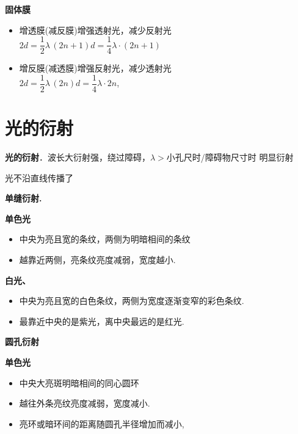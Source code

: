 \textbf{固体膜}

\begin{itemize}
\item 增透膜(减反膜)\quad 增强透射光，减少反射光\\
  $2d=\dfrac{1}{2}\lambda\,(2n+1)$\qquad $d=\dfrac{1}{4}\lambda\cdot(2n+1)$
\item 增反膜(减透膜)\quad 增强反射光，减少透射光\\
  $2d=\dfrac{1}{2}\lambda\,(2n)$\qquad $d=\dfrac{1}{4}\lambda\cdot 2n$,
\end{itemize}



\section{光的衍射}
\textbf{光的衍射}．波长大衍射强，绕过障碍，$\lambda>$小孔尺时/障碍物尺寸时 明显衍射

光不沿直线传播了

\textbf{单缝衍射.}


\textbf{单色光}
\begin{itemize}
\item 中央为亮且宽的条纹，两侧为明暗相间的条纹
\item 越靠近两侧，亮条纹亮度减弱，宽度越小.
\end{itemize}

\textbf{白光、}
\begin{itemize}
\item 中央为亮且宽的白色条纹，两侧为宽度逐渐变窄的彩色条纹.
\item 最靠近中央的是紫光，离中央最远的是红光.
\end{itemize}

\textbf{圆孔衍射}


\textbf{单色光}
\begin{itemize}
\item 中央大亮斑\quad 明暗相间的同心圆环
\item 越往外\quad 条亮纹亮度减弱，宽度减小. %
\item 亮环或暗环间的距离随圆孔半径增加而减小,
\end{itemize}


